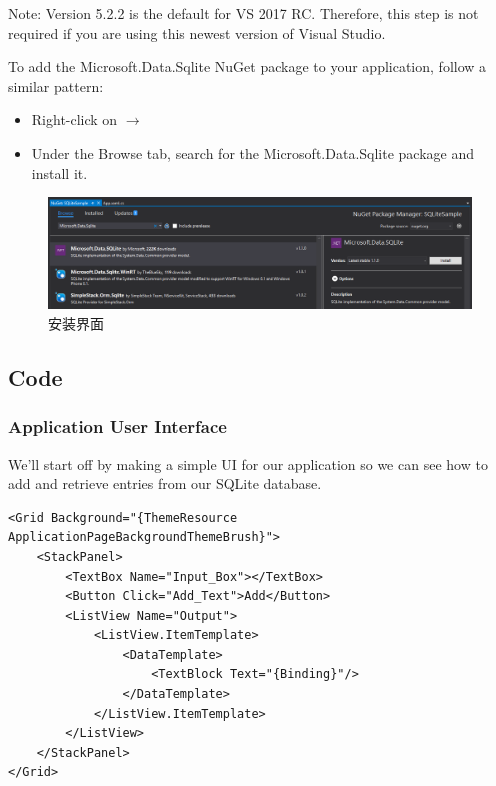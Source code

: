 Note: Version 5.2.2 is the default for VS 2017 RC. Therefore, this step is not required if you are using this newest version of Visual Studio.

To add the Microsoft.Data.Sqlite NuGet package to your application, follow a similar pattern:

\begin{itemize}
	\item Right-click on  $ \to $ 
	\item Under the Browse tab, search for the Microsoft.Data.Sqlite package and install it.
\end{itemize}

\begin{figure}
	\centering
	\includegraphics[width=\linewidth]{figures/sqlite_install_microsoft.data.sqlite}
	\caption{安装界面}
	\label{fig:Microsoft.Data.Sqlite安装界面}
\end{figure}

\subsection{Code}

\subsubsection{Application User Interface}

We’ll start off by making a simple UI for our application so we can see how to add and retrieve entries from our SQLite database.

\begin{lstlisting}[style=HtmlStyle]
<Grid Background="{ThemeResource ApplicationPageBackgroundThemeBrush}">
	<StackPanel>
		<TextBox Name="Input_Box"></TextBox>
		<Button Click="Add_Text">Add</Button>
		<ListView Name="Output">
			<ListView.ItemTemplate>
				<DataTemplate>
					<TextBlock Text="{Binding}"/>
				</DataTemplate>
			</ListView.ItemTemplate>
		</ListView>
	</StackPanel>
</Grid>
\end{lstlisting}

